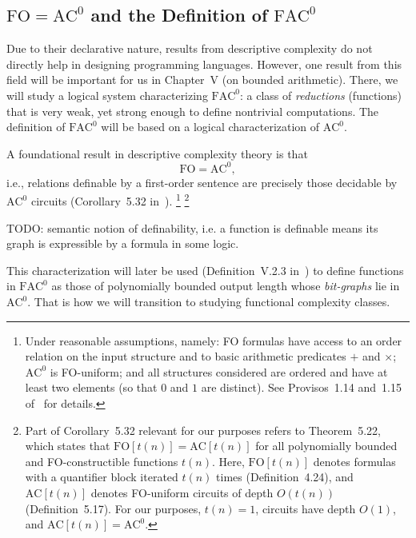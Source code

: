 \subsection{\texorpdfstring{$\mathrm{FO} = \mathrm{AC}^0$}{FO = AC0} and the Definition of \texorpdfstring{$\mathrm{FAC}^0$}{FAC0}}

Due to their declarative nature, results from descriptive complexity do not
directly help in designing programming languages.
However, one result from this field will be important for us in
Chapter~V (on bounded arithmetic). There, we will study a logical system
characterizing \(\mathrm{FAC}^0\): a class of \emph{reductions} (functions) that is very weak,
yet strong enough to define nontrivial computations.
The definition of \(\mathrm{FAC}^0\) will be based on a logical characterization of
\(\mathrm{AC}^0\).

A foundational result in descriptive complexity theory is that
\[
\mathrm{FO} = \mathrm{AC}^0,
\]
i.e., relations definable by a first-order sentence are precisely those
decidable by \(\mathrm{AC}^0\) circuits
(Corollary~5.32 in~\cite{Immerman1999-IMMDC}).%
\footnote{%
Under reasonable assumptions, namely:
FO formulas have access to an order relation on the input structure and to
basic arithmetic predicates \(+\) and \(\times\);
\(\mathrm{AC}^0\) is FO-uniform; and
all structures considered are ordered and have at least two elements (so that
\(0\) and \(1\) are distinct).
See Provisos~1.14 and~1.15 of~\cite{Immerman1999-IMMDC} for details.%
}
\footnote{%
Part of Corollary~5.32 relevant for our purposes refers to Theorem~5.22,
which states that \(\mathrm{FO}[t(n)] = \mathrm{AC}[t(n)]\)
for all polynomially bounded and FO-constructible functions \(t(n)\).
Here, \(\mathrm{FO}[t(n)]\) denotes formulas with a quantifier block iterated
\(t(n)\) times (Definition~4.24), and
\(\mathrm{AC}[t(n)]\) denotes FO-uniform circuits of depth \(O(t(n))\)
(Definition~5.17).
For our purposes, \(t(n) = 1\), circuits have depth \(O(1)\),
and \(\mathrm{AC}[t(n)] = \mathrm{AC}^0\).%
}

TODO: semantic notion of definability, i.e. a function is definable means
its graph is expressible by a formula in some logic.

This characterization will later be used (Definition~V.2.3 in~\cite{Cook_Nguyen_2010})
to define functions in \(\mathrm{FAC}^0\) as those of polynomially bounded output length
whose \emph{bit-graphs} lie in \(\mathrm{AC}^0\).
That is how we will transition to studying functional complexity classes.

